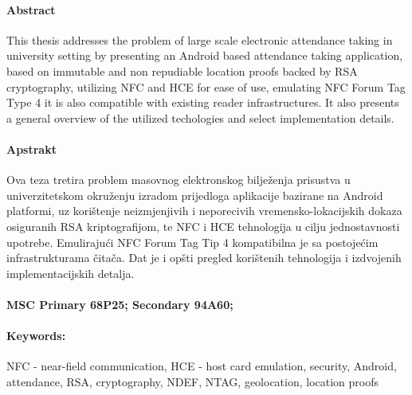 \paragraph*{Abstract}
This thesis addresses the problem of large scale electronic attendance taking in university setting by presenting an Android based attendance taking application, based on immutable and non repudiable location proofs backed by RSA cryptography, utilizing NFC and HCE for ease of use, emulating NFC Forum Tag Type 4 it is also compatible with existing reader infrastructures. It also presents a general overview of the utilized techologies and select implementation details.

\paragraph*{Apstrakt}
Ova teza tretira problem masovnog elektronskog bilježenja prisustva u univerzitetskom okruženju izradom prijedloga aplikacije bazirane na Android platformi, uz korištenje neizmjenjivih i neporecivih vremensko-lokacijskih dokaza osiguranih RSA kriptografijom, te NFC i HCE tehnologija u cilju jednostavnosti upotrebe. Emulirajući NFC Forum Tag Tip 4 kompatibilna je sa postojećim infrastrukturama čitača. Dat je i opšti pregled korištenih tehnologija i izdvojenih implementacijskih detalja.

\paragraph*{MSC Primary 68P25; Secondary 94A60;}
\paragraph*{Keywords:} NFC - near-field communication, HCE - host card emulation, security, Android, attendance, RSA, cryptography, NDEF, NTAG, geolocation, location proofs